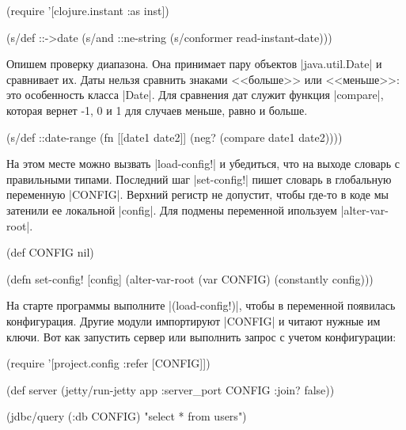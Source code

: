 \begin{english}
  \begin{clojure}
(require '[clojure.instant :as inst])

(s/def ::->date
  (s/and ::ne-string (s/conformer read-instant-date)))
  \end{clojure}
\end{english}

Опишем проверку диапазона. Она принимает пару объектов \spverb|java.util.Date| и
сравнивает их. Даты нельзя сравнить знаками <<больше>> или <<меньше>>: это
особенность класса \spverb|Date|. Для сравнения дат служит функция
\spverb|compare|, которая вернет -1, 0 и 1 для случаев меньше, равно и больше.

\begin{english}
  \begin{clojure}
(s/def ::date-range
  (fn [[date1 date2]]
    (neg? (compare date1 date2))))
  \end{clojure}
\end{english}

На этом месте можно вызвать \spverb|load-config!| и убедиться, что на выходе
словарь с правильными типами. Последний шаг \spverb|set-config!| пишет словарь в
глобальную переменную \spverb|CONFIG|. Верхний регистр не допустит, чтобы где-то
в коде мы затенили ее локальной \spverb|config|. Для подмены переменной
ипользуем \spverb|alter-var-root|.

\begin{english}
  \begin{clojure}
(def CONFIG nil)

(defn set-config!
  [config]
  (alter-var-root (var CONFIG) (constantly config)))
  \end{clojure}
\end{english}

На старте программы выполните \spverb|(load-config!)|, чтобы в переменной
появилась конфигурация. Другие модули импортируют \spverb|CONFIG| и читают
нужные им ключи. Вот как запустить сервер или выполнить запрос с учетом
конфигурации:

\begin{english}
  \begin{clojure}
(require '[project.config :refer [CONFIG]])

(def server
  (jetty/run-jetty app {:server_port CONFIG
                        :join? false}))

(jdbc/query (:db CONFIG) "select * from users")
  \end{clojure}
\end{english}

